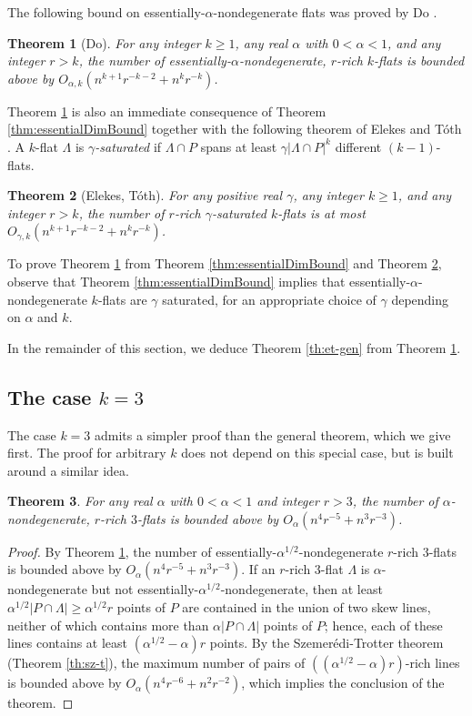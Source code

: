\documentclass{article}
\newtheorem{theorem}{Theorem}
\begin{document}
The following bound on essentially-$\alpha$-nondegenerate flats was proved by Do \cite{do2016extending}.
\begin{theorem}[Do]\label{th:do}
For any integer $k \geq 1$, any real $\alpha$ with $0 < \alpha < 1$, and any integer $r > k$, the number of essentially-$\alpha$-nondegenerate, $r$-rich $k$-flats is bounded above by $O_{\alpha,k}(n^{k+1}r^{-k-2} + n^kr^{-k})$.
\end{theorem}

Theorem \ref{th:do} is also an immediate consequence of Theorem \ref{thm:essentialDimBound} together with the following theorem of Elekes and T\'oth \cite{elekes2005incidences}.
A $k$-flat $\Lambda$ is {\em $\gamma$-saturated} if $\Lambda \cap P$ spans at least $\gamma |\Lambda \cap P|^k$ different $(k-1)$-flats.
\begin{theorem}[Elekes, T\'oth]\label{th:elktot}
For any positive real $\gamma$, any integer $k \geq 1$, and any integer $r > k$, the number of $r$-rich $\gamma$-saturated $k$-flats is at most $O_{\gamma,k}(n^{k+1}r^{-k-2} + n^k r^{-k})$.
\end{theorem}

To prove Theorem \ref{th:do} from Theorem \ref{thm:essentialDimBound} and Theorem \ref{th:elktot}, observe that Theorem \ref{thm:essentialDimBound} implies that essentially-$\alpha$-nondegenerate $k$-flats are $\gamma$ saturated, for an appropriate choice of $\gamma$ depending on $\alpha$ and $k$.

In the remainder of this section, we deduce Theorem \ref{th:et-gen} from Theorem \ref{th:do}.

\subsection{The case $k=3$}
The case $k=3$ admits a simpler proof than the general theorem, which we give first.
The proof for arbitrary $k$ does not depend on this special case, but is built around a similar idea.

\begin{theorem}\label{th:et-3}
For any real $\alpha$ with $0 < \alpha < 1$ and integer $r > 3$, the number of $\alpha$-nondegenerate, $r$-rich $3$-flats is bounded above by $O_\alpha(n^{4}r^{-5} + n^3 r^{-3})$.
\end{theorem}
\begin{proof}
By Theorem \ref{th:do}, the number of essentially-$\alpha^{1/2}$-nondegenerate $r$-rich $3$-flats is bounded above by $O_\alpha(n^{4}r^{-5} + n^3 r^{-3})$.
If an $r$-rich $3$-flat $\Lambda$ is $\alpha$-nondegenerate but not essentially-$\alpha^{1/2}$-nondegenerate, then at least $\alpha^{1/2} |P \cap \Lambda| \geq \alpha^{1/2}r$ points of $P$ are contained in the union of two skew lines, neither of which contains more than $\alpha |P \cap \Lambda|$ points of $P$; hence, each of these lines contains at least $(\alpha^{1/2} - \alpha)r$ points.
By the Szemer\'edi-Trotter theorem (Theorem \ref{th:sz-t}), the maximum number of pairs of $((\alpha^{1/2} - \alpha)r)$-rich lines is bounded above by $O_\alpha(n^4 r^{-6} + n^2 r^{-2})$, which implies the conclusion of the theorem.
\end{proof}
\end{document}
